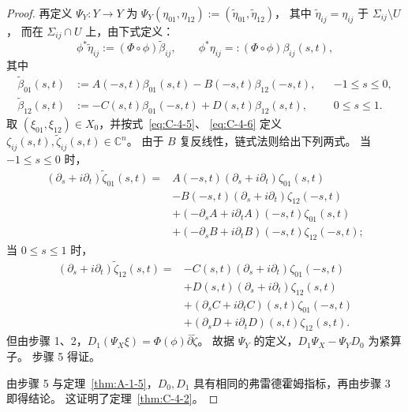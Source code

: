 \begin{proof}
再定义 $\Psi_Y:Y\to Y$ 为
$\Psi_Y(\eta_{01},\eta_{12}):=(\widetilde\eta_{01},\widetilde\eta_{12})$，
其中 $\widetilde\eta_{ij}=\eta_{ij}$ 于 $\Sigma_{ij}\setminus U$，
而在 $\Sigma_{ij}\cap U$ 上，由下式定义：
\begin{equation}\label{eq:C-4-7}
  \phi^*\widetilde\eta_{ij}:=(\Phi\circ\phi)\widetilde\beta_{ij},\qquad
  \phi^*\eta_{ij}=:(\Phi\circ\phi)\beta_{ij}(s,t),
\end{equation}
其中
\begin{equation}\label{eq:C-4-8}
\begin{aligned}
  \widetilde\beta_{01}(s,t)
    &:=A(-s,t)\beta_{01}(s,t)-B(-s,t)\beta_{12}(-s,t),
      &&-1\le s\le0,\\
  \widetilde\beta_{12}(s,t)
    &:=-C(s,t)\beta_{01}(-s,t)+D(s,t)\beta_{12}(s,t),
      &&0\le s\le1.
\end{aligned}
\end{equation}
取 $(\xi_{01},\xi_{12})\in X_0$，并按式~\eqref{eq:C-4-5}、
\eqref{eq:C-4-6} 定义 $\zeta_{ij}(s,t),\widetilde\zeta_{ij}(s,t)\in\mathbb C^n$。
由于 $B$ 复反线性，链式法则给出下列两式。
当 $-1\le s\le0$ 时，
\begin{align*}
  (\partial_s+i\partial_t)\widetilde\zeta_{01}(s,t)
  ={}&A(-s,t)(\partial_s+i\partial_t)\zeta_{01}(s,t)\\
    &-B(-s,t)(\partial_s+i\partial_t)\zeta_{12}(-s,t)\\
    &+(-\partial_sA+i\partial_tA)(-s,t)\zeta_{01}(s,t)\\
    &+(-\partial_sB+i\partial_tB)(-s,t)\zeta_{12}(-s,t);
\end{align*}
当 $0\le s\le1$ 时，
\begin{align*}
  (\partial_s+i\partial_t)\widetilde\zeta_{12}(s,t)
  ={}&-C(s,t)(\partial_s+i\partial_t)\zeta_{01}(-s,t)\\
    &+D(s,t)(\partial_s+i\partial_t)\zeta_{12}(s,t)\\
    &+(\partial_sC+i\partial_tC)(s,t)\zeta_{01}(-s,t)\\
    &+(\partial_sD+i\partial_tD)(s,t)\zeta_{12}(s,t).
\end{align*}
但由步骤 1、2，$D_1(\Psi_X\xi)=\Phi(\phi)\bar\partial\widetilde\zeta$。
故据 $\Psi_Y$ 的定义，$D_1\Psi_X-\Psi_YD_0$ 为紧算子。
步骤 5 得证。

由步骤 5 与定理~\ref{thm:A-1-5}，$D_0,D_1$
具有相同的弗雷德霍姆指标，再由步骤 3 即得结论。
这证明了定理~\ref{thm:C-4-2}。
\end{proof}

